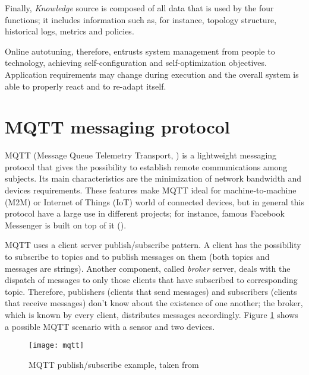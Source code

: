 Finally, \textit{Knowledge} source is composed of all data that is used by the four functions; it includes information such as, for instance, topology structure, historical logs, metrics and policies.

Online autotuning, therefore, entrusts system management from people to technology, achieving self-configuration and self-op\-ti\-mi\-za\-tion objectives. Application requirements may change during execution and the overall system is able to properly react and to re-adapt itself.





\section{MQTT messaging protocol}\label{mqtt}

MQTT (Message Queue Telemetry Transport, \cite{banks2014mqtt}) is a light\-weight messaging protocol that gives the possibility to establish remote communications among subjects. Its main characteristics are the minimization of network bandwidth and devices requirements. These features make MQTT ideal for machine-to-machine (M2M) or Internet of Things (IoT) world of connected devices, but in general this protocol have a large use in different projects; for instance, famous Facebook Messenger is built on top of it (\cite{zhang2011building}).

MQTT uses a client server publish\slash{}subscribe pattern. A client has the possibility to subscribe to topics and to publish messages on them (both topics and messages are strings). Another component, called \textit{broker} server, deals with the dispatch of messages to only those clients that have subscribed to corresponding topic. Therefore, publishers (clients that send messages) and subscribers (clients that receive messages) don't know about the existence of one another; the broker, which is known by every client, distributes messages accordingly. Figure \ref{fig::mqtt_example} shows a possible MQTT scenario with a sensor and two devices.

\begin{figure}[htb]

    \centering
    \texttt{[image: mqtt]}
    \caption[MQTT publish/subscribe example]{MQTT publish/subscribe example, taken from \cite{site:hivemq}}
    \label{fig::mqtt_example}

\end{figure}

